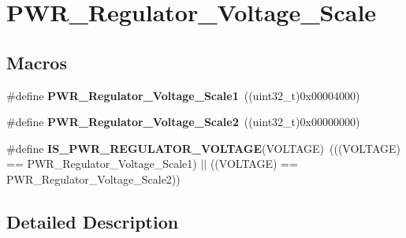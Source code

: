\hypertarget{group___p_w_r___regulator___voltage___scale}{}\section{P\+W\+R\+\_\+\+Regulator\+\_\+\+Voltage\+\_\+\+Scale}
\label{group___p_w_r___regulator___voltage___scale}
\subsection*{Macros}
\begin{DoxyCompactItemize}
\item 
\hypertarget{group___p_w_r___regulator___voltage___scale_ga3626811fd793b5f5cf9d510acfcbffc4}{}\#define {\bfseries P\+W\+R\+\_\+\+Regulator\+\_\+\+Voltage\+\_\+\+Scale1}~((uint32\+\_\+t)0x00004000)\label{group___p_w_r___regulator___voltage___scale_ga3626811fd793b5f5cf9d510acfcbffc4}

\item 
\hypertarget{group___p_w_r___regulator___voltage___scale_ga93ae6faf954e9478cf719f9b05c9cba8}{}\#define {\bfseries P\+W\+R\+\_\+\+Regulator\+\_\+\+Voltage\+\_\+\+Scale2}~((uint32\+\_\+t)0x00000000)\label{group___p_w_r___regulator___voltage___scale_ga93ae6faf954e9478cf719f9b05c9cba8}

\item 
\hypertarget{group___p_w_r___regulator___voltage___scale_gab7f9039ed34cc5af3d57606c726e66a2}{}\#define {\bfseries I\+S\+\_\+\+P\+W\+R\+\_\+\+R\+E\+G\+U\+L\+A\+T\+O\+R\+\_\+\+V\+O\+L\+T\+A\+G\+E}(V\+O\+L\+T\+A\+G\+E)~(((V\+O\+L\+T\+A\+G\+E) == P\+W\+R\+\_\+\+Regulator\+\_\+\+Voltage\+\_\+\+Scale1) $\vert$$\vert$ ((V\+O\+L\+T\+A\+G\+E) == P\+W\+R\+\_\+\+Regulator\+\_\+\+Voltage\+\_\+\+Scale2))\label{group___p_w_r___regulator___voltage___scale_gab7f9039ed34cc5af3d57606c726e66a2}

\end{DoxyCompactItemize}


\subsection{Detailed Description}
